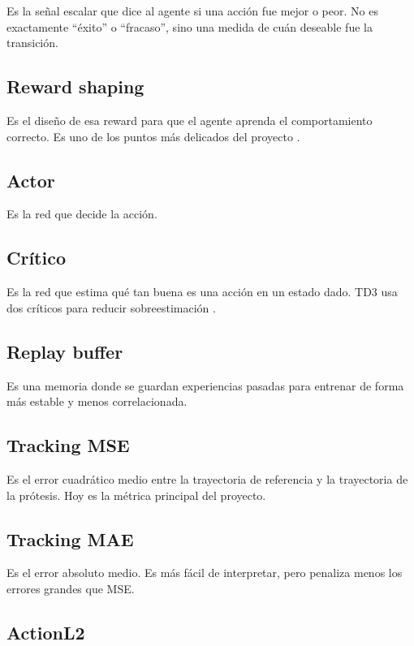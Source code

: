 \documentclass[11pt,a4paper]{article}
\begin{document}
Es la se\~nal escalar que dice al agente si una acci\'on fue mejor o peor. No es exactamente ``\'exito'' o ``fracaso'', sino una medida de cu\'an deseable fue la transici\'on.

\subsection{Reward shaping}

Es el dise\~no de esa reward para que el agente aprenda el comportamiento correcto. Es uno de los puntos m\'as delicados del proyecto \citep{deng2025reward}.

\subsection{Actor}

Es la red que decide la acci\'on.

\subsection{Cr\'itico}

Es la red que estima qu\'e tan buena es una acci\'on en un estado dado. TD3 usa dos cr\'iticos para reducir sobreestimaci\'on \citep{fujimoto2018td3}.

\subsection{Replay buffer}

Es una memoria donde se guardan experiencias pasadas para entrenar de forma m\'as estable y menos correlacionada.

\subsection{Tracking MSE}

Es el error cuadr\'atico medio entre la trayectoria de referencia y la trayectoria de la pr\'otesis. Hoy es la m\'etrica principal del proyecto.

\subsection{Tracking MAE}

Es el error absoluto medio. Es m\'as f\'acil de interpretar, pero penaliza menos los errores grandes que MSE.

\subsection{ActionL2}
\end{document}
